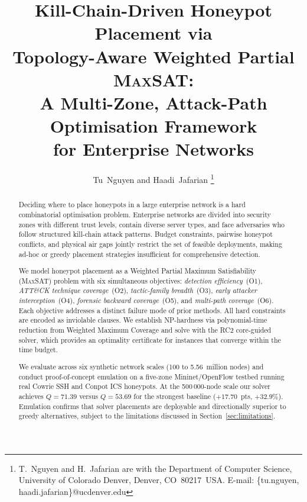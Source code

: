 \documentclass[journal]{IEEEtran}
\newcommand{\MAXSAT}{\textsc{MaxSAT}}
\begin{document}
\title{Kill-Chain-Driven Honeypot Placement via\\
Topology-Aware Weighted Partial \MAXSAT{}:\\
A Multi-Zone, Attack-Path Optimisation Framework\\
for Enterprise Networks}

\author{Tu~Nguyen and Haadi~Jafarian%
\thanks{T.~Nguyen and H.~Jafarian are with the Department of Computer
Science, University of Colorado Denver, Denver, CO~80217~USA.
E-mail: \{tu.nguyen, haadi.jafarian\}@ucdenver.edu}}

\maketitle

\begin{abstract}
Deciding where to place honeypots in a large enterprise network is a
hard combinatorial optimisation problem. Enterprise networks are divided
into security zones with different trust levels, contain diverse server
types, and face adversaries who follow structured kill-chain attack
patterns. Budget constraints, pairwise honeypot conflicts, and physical
air gaps jointly restrict the set of feasible deployments, making ad-hoc
or greedy placement strategies insufficient for comprehensive detection.

We model honeypot placement as a Weighted Partial Maximum
Satisfiability (\MAXSAT{}) problem with six simultaneous objectives:
\emph{detection efficiency}~(O1), \emph{ATT\&CK technique coverage}~(O2),
\emph{tactic-family breadth}~(O3), \emph{early attacker interception}~(O4),
\emph{forensic backward coverage}~(O5), and \emph{multi-path
coverage}~(O6). Each objective addresses a distinct failure mode of prior
methods. All hard constraints are encoded as inviolable clauses.
We establish NP-hardness via polynomial-time reduction from Weighted
Maximum Coverage and solve with the RC2 core-guided solver, which
provides an optimality certificate for instances that converge within
the time budget.

We evaluate across six synthetic network scales (100 to 5.56~million
nodes) and conduct proof-of-concept emulation on a five-zone
Mininet/OpenFlow testbed running real Cowrie SSH and Conpot ICS
honeypots. At the 500\,000-node scale our solver achieves $Q=71.39$
versus $Q=53.69$ for the strongest baseline ($+17.70$~pts, $+32.9\%$).
Emulation confirms that solver placements are deployable and
directionally superior to greedy alternatives, subject to the
limitations discussed in Section~\ref{sec:limitations}.
\end{abstract}
\end{document}
